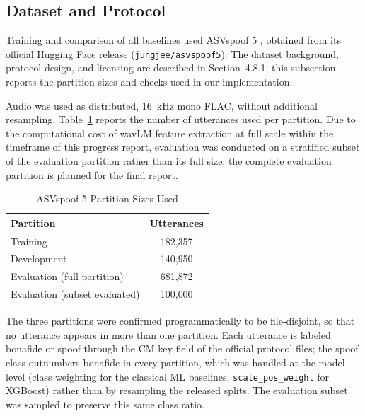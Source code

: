 \subsection{Dataset and Protocol}

Training and comparison of all baselines used ASVspoof 5 \cite{wang24_asvspoof}, obtained from its official Hugging Face release (\texttt{jungjee/asvspoof5}). The dataset background, protocol design, and licensing are described in Section~4.8.1; this subsection reports the partition sizes and checks used in our implementation.

Audio was used as distributed, 16~kHz mono FLAC, without additional resampling. Table~\ref{tab:asvspoof5_stats} reports the number of utterances used per partition. Due to the computational cost of wavLM feature extraction at full scale within the timeframe of this progress report, evaluation was conducted on a stratified subset of the evaluation partition rather than its full size; the complete evaluation partition is planned for the final report.

\renewcommand{\arraystretch}{1.4}
\setlength{\tabcolsep}{10pt}
\begin{table}[H]
\centering
\caption{ASVspoof 5 Partition Sizes Used}
\label{tab:asvspoof5_stats}
\begin{tabular}{l c}
\hline
\textbf{Partition} & \textbf{Utterances} \\
\hline
Training & 182{,}357 \\
Development & 140{,}950 \\
Evaluation (full partition) & 681{,}872 \\
Evaluation (subset evaluated) & 100{,}000 \\
\hline
\end{tabular}
\end{table}

The three partitions were confirmed programmatically to be file-disjoint, so that no utterance appears in more than one partition. Each utterance is labeled bonafide or spoof through the CM key field of the official protocol files; the spoof class outnumbers bonafide in every partition, which was handled at the model level (class weighting for the classical ML baselines, \texttt{scale\_pos\_weight} for XGBoost) rather than by resampling the released splits. The evaluation subset was sampled to preserve this same class ratio.